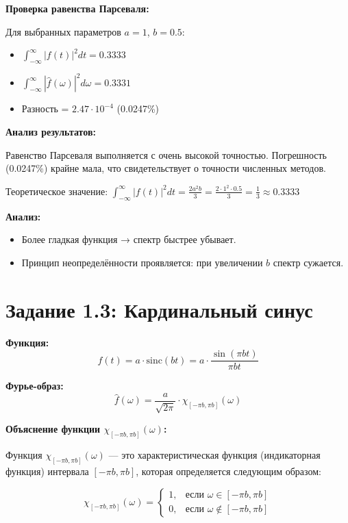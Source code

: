 \textbf{Проверка равенства Парсеваля:}

Для выбранных параметров $a = 1$, $b = 0.5$:
\begin{itemize}
    \item $\displaystyle \int_{-\infty}^{\infty} |f(t)|^2 dt = 0.3333$
    \item $\displaystyle \int_{-\infty}^{\infty} |\hat{f}(\omega)|^2 d\omega = 0.3331$
    \item Разность = $2.47 \cdot 10^{-4}$ (0.0247\%)
\end{itemize}

\textbf{Анализ результатов:}

Равенство Парсеваля выполняется с очень высокой точностью. Погрешность (0.0247\%) крайне мала, что свидетельствует о точности численных методов.

Теоретическое значение: $\displaystyle \int_{-\infty}^{\infty} |f(t)|^2 dt = \frac{2 a^2 b}{3} = \frac{2 \cdot 1^2 \cdot 0.5}{3} = \frac{1}{3} \approx 0.3333$

\textbf{Анализ:}

\begin{itemize}
    \item Более гладкая функция → спектр быстрее убывает.
    \item Принцип неопределённости проявляется: при увеличении $b$ спектр сужается.
\end{itemize}

\section*{Задание 1.3: Кардинальный синус}

\textbf{Функция:}
\[
f(t) = a \cdot \mathrm{sinc}(bt) = a \cdot \frac{\sin(\pi b t)}{\pi b t}
\]

\textbf{Фурье-образ:}
\[
\hat{f}(\omega) = \frac{a}{\sqrt{2\pi}} \cdot \chi_{[-\pi b, \pi b]}(\omega)
\]

\textbf{Объяснение функции $\chi_{[-\pi b, \pi b]}(\omega)$:}

Функция $\chi_{[-\pi b, \pi b]}(\omega)$ — это характеристическая функция (индикаторная функция) интервала $[-\pi b, \pi b]$, которая определяется следующим образом:

\[
\chi_{[-\pi b, \pi b]}(\omega) = 
\begin{cases}
1, & \text{если } \omega \in [-\pi b, \pi b] \\
0, & \text{если } \omega \notin [-\pi b, \pi b]
\end{cases}
\]

